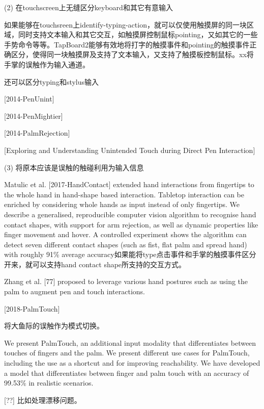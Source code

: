 (2) 在touchscreen上无缝区分keyboard和其它有意输入

如果能够在touchsreen上identify-typing-action，就可以仅使用触摸屏的同一块区域，同时支持文本输入和其它交互，如触摸屏控制鼠标pointing，又如其它的一些手势命令等等。TapBoard2能够有效地将打字的触摸事件和pointing的触摸事件正确区分，使得同一块触摸屏及支持了文本输入，又支持了触摸板控制鼠标。xx将手掌的误触作为输入通道。

还可以区分typing和stylus输入

[2014-PenUnint]

[2014-PenMightier]

[2014-PalmRejection]

[Exploring and Understanding Unintended Touch during Direct Pen Interaction]

(3) 将原本应该是误触的触碰利用为输入信息

Matulic et al. [2017-HandContact] extended hand interactions from fingertips to the whole hand in hand-shape based interaction. Tabletop interaction can be enriched by considering whole hands as input instead of only fingertips. We describe a
generalised, reproducible computer vision algorithm to recognise hand contact shapes, with support for arm rejection, as well as dynamic properties like finger movement
and hover. A controlled experiment shows the algorithm can detect seven different contact shapes (such as fist, flat palm and spread hand) with roughly 91\% average accuracy如果能将type点击事件和手掌的触摸事件区分开来，就可以支持hand contact shape所支持的交互方式。

Zhang et al. [77] proposed to leverage various hand postures such as using the palm to augment pen and touch interactions.

[2018-PalmTouch]

将大鱼际的误触作为模式切换。

We present PalmTouch, an additional input modality that differentiates between touches of fingers and the palm. We present different use cases for PalmTouch, including the
use as a shortcut and for improving reachability.  We have developed a model that differentiates between finger and palm touch with an accuracy of 99.53\% in realistic scenarios.

[??] 比如处理漂移问题。


